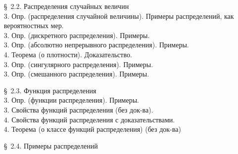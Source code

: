 \documentclass[10pt]{amsart}
\begin{document}
\begin{enumerate}
\begin{enumerate}
    
\item[\S\, 2.2.] Распределения случайных величин \\
3. Опр. (распределения случайной величины). Примеры распределений, как вероятностных мер. \\
3. Опр. (дискретного распределения). Примеры. \\
3. Опр. (абсолютно непрерывного распределения). Примеры. \\
4. Теорема (о плотности). Доказательство. \\
3. Опр. (сингулярного распределения). Примеры. \\
3. Опр. (смешанного распределения). Примеры. \\


\item[\S\, 2.3.] Функция распределения \\
    
3. Опр. (функции распределения). Примеры. \\
3. Свойства функций распределения (без док-ва). \\
4. Свойства функций распределения с доказательствами. \\
4. Теорема (о классе функций распределения) (без док-ва)\\


\item[\S\, 2.4.] Примеры распределений \\
    

\end{enumerate}
\end{enumerate}
\end{document}
